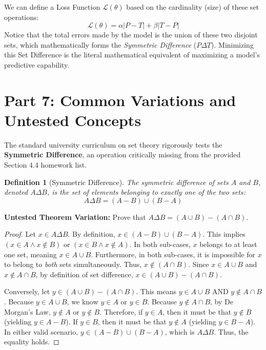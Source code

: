 \documentclass[11pt]{article}
\newtheorem{definition}[theorem]{Definition}
\begin{document}
We can define a Loss Function $\mathcal{L}(\theta)$ based on the cardinality (size) of these set operations:
\[ \mathcal{L}(\theta) = \alpha |P - T| + \beta |T - P| \]
Notice that the total errors made by the model is the union of these two disjoint sets, which mathematically forms the \textit{Symmetric Difference} ($P \Delta T$). Minimizing this Set Difference is the literal mathematical equivalent of maximizing a model's predictive capability.

\section{Part 7: Common Variations and Untested Concepts}

The standard university curriculum on set theory rigorously tests the \textbf{Symmetric Difference}, an operation critically missing from the provided Section 4.4 homework list. 

\begin{definition}[Symmetric Difference]
The symmetric difference of sets $A$ and $B$, denoted $A \Delta B$, is the set of elements belonging to exactly one of the two sets: 
\[ A \Delta B = (A - B) \cup (B - A) \]
\end{definition}

\textbf{Untested Theorem Variation:} Prove that $A \Delta B = (A \cup B) - (A \cap B)$. 

\begin{proof}
Let $x \in A \Delta B$. By definition, $x \in (A - B) \cup (B - A)$.
This implies $(x \in A \land x \notin B)$ or $(x \in B \land x \notin A)$.
In both sub-cases, $x$ belongs to at least one set, meaning $x \in A \cup B$. 
Furthermore, in both sub-cases, it is impossible for $x$ to belong to \textit{both} sets simultaneously. Thus, $x \notin (A \cap B)$.
Since $x \in A \cup B$ and $x \notin A \cap B$, by definition of set difference, $x \in (A \cup B) - (A \cap B)$.

Conversely, let $y \in (A \cup B) - (A \cap B)$. 
This means $y \in A \cup B$ AND $y \notin A \cap B$. 
Because $y \in A \cup B$, we know $y \in A$ or $y \in B$. 
Because $y \notin A \cap B$, by De Morgan's Law, $y \notin A$ or $y \notin B$. 
Therefore, if $y \in A$, then it must be that $y \notin B$ (yielding $y \in A - B$). If $y \in B$, then it must be that $y \notin A$ (yielding $y \in B - A$).
In either valid scenario, $y \in (A - B) \cup (B - A)$, which is $A \Delta B$. 
Thus, the equality holds.
\end{proof}
\end{document}
